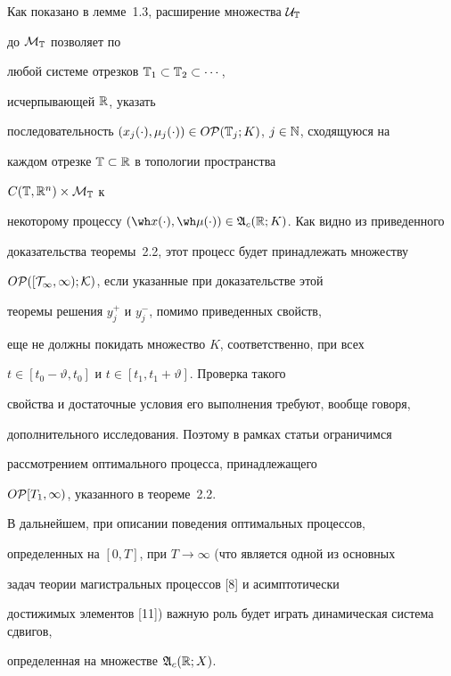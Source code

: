 \begin{notes}


Как показано в лемме~1.3, расширение множества $\cal U_{\Bbb T}$


до $\cal M_{\Bbb T}$ позволяет по


любой системе отрезков $\Bbb T_1\subset\Bbb T_2\subset\dotsb$,


исчерпывающей $\Bbb R$, указать


последовательность $(x_j(\cdot),\mu_j(\cdot))


\in O{\cal P}({\Bbb T}_j;K)$, $j\in{\Bbb N}$, сходящуюся на


каждом отрезке ${\Bbb T}\subset{\Bbb R}$ в топологии пространства


$C(\Bbb T,\Bbb R^n) \times\cal M_{\Bbb T}$ к


некоторому процессу $(\wh x(\cdot),\wh\mu(\cdot))\in


\frak A_c(\Bbb R;K)$. Как видно из приведенного


доказательства теоремы~2.2, этот процесс будет принадлежать множеству


$O\cal P([T_1,\infty);K)$, если указанные при доказательстве этой


теоремы решения $y_j^+$ и $y_j^-$, помимо приведенных свойств,


еще не должны покидать множество $K$, соответственно, при всех


$t\in[t_0-\vartheta,t_0]$ и $t\in[t_1,t_1+\vartheta]$. Проверка такого


свойства и достаточные условия его выполнения требуют, вообще говоря,


дополнительного исследования. Поэтому в рамках статьи ограничимся


рассмотрением оптимального процесса, принадлежащего


$O{\cal P}[T_1,\infty)$, указанного в теореме~2.2.


\end{notes}





В дальнейшем, при описании поведения оптимальных процессов,


определенных на $[0,T]$, при $T\to\infty$ (что является одной из основных


задач теории магистральных процессов [8] и асимптотически


достижимых элементов [11]) важную роль будет играть динамическая система сдвигов,


определенная на множестве $\frak A_c(\Bbb R;X)$. 


